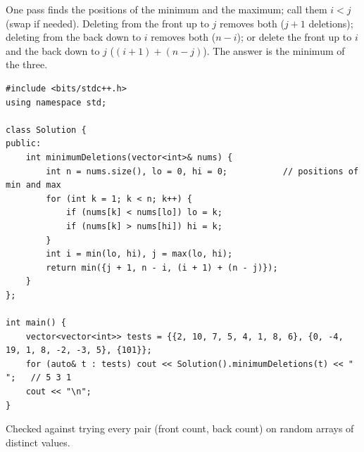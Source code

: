 \begin{solutionbox}
One pass finds the positions of the minimum and the maximum; call them $i < j$ (swap if needed). Deleting from the front up to $j$ removes both ($j + 1$ deletions); deleting from the back down to $i$ removes both ($n - i$); or delete the front up to $i$ and the back down to $j$ ($(i + 1) + (n - j)$). The answer is the minimum of the three.
\begin{lstlisting}[style=cpp]
#include <bits/stdc++.h>
using namespace std;

class Solution {
public:
    int minimumDeletions(vector<int>& nums) {
        int n = nums.size(), lo = 0, hi = 0;           // positions of min and max
        for (int k = 1; k < n; k++) {
            if (nums[k] < nums[lo]) lo = k;
            if (nums[k] > nums[hi]) hi = k;
        }
        int i = min(lo, hi), j = max(lo, hi);
        return min({j + 1, n - i, (i + 1) + (n - j)});
    }
};

int main() {
    vector<vector<int>> tests = {{2, 10, 7, 5, 4, 1, 8, 6}, {0, -4, 19, 1, 8, -2, -3, 5}, {101}};
    for (auto& t : tests) cout << Solution().minimumDeletions(t) << " ";   // 5 3 1
    cout << "\n";
}
\end{lstlisting}
\begin{center}
\end{center}
Checked against trying every pair (front count, back count) on random arrays of distinct values.
\end{solutionbox}
